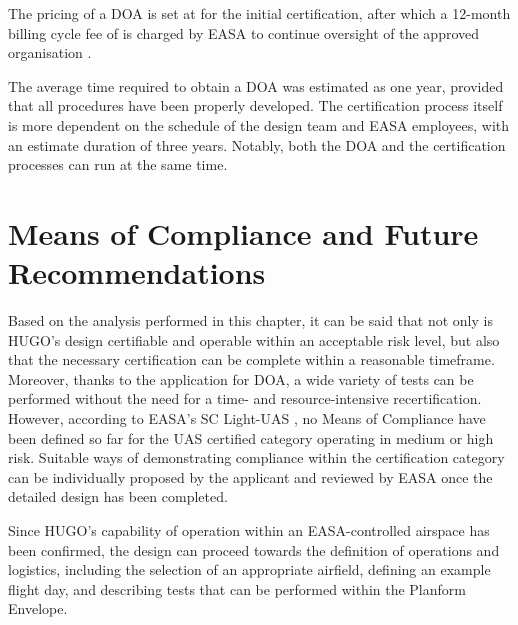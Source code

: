 The pricing of a DOA is set at  for the initial certification, after which a 12-month billing cycle fee of  is charged by EASA to continue oversight of the approved organisation  \cite{EUReg2025_2347}.


The average time required to obtain a DOA was estimated as one year, provided that all procedures have been properly developed. The certification process itself is more dependent on the schedule of the design team and EASA employees, with an estimate duration of three years. Notably, both the DOA and the certification processes can run at the same time.

\section{Means of Compliance and Future Recommendations}
\label{sec:means_of_compliance}
Based on the analysis performed in this chapter, it can be said that not only is HUGO's design certifiable and operable within an acceptable risk level, but also that the necessary certification can be complete within a reasonable timeframe. Moreover, thanks to the application for DOA, a wide variety of tests can be performed without the need for a time- and resource-intensive recertification. However, according to EASA's SC Light-UAS \cite{easa_light_uas_crd_is3}, no Means of Compliance have been defined so far for the UAS certified category operating in medium or high risk. Suitable ways of demonstrating compliance within the certification category can be individually proposed by the applicant and reviewed by EASA once the detailed design has been completed.

Since HUGO's capability of operation within an EASA-controlled airspace has been confirmed, the design can proceed towards the definition of operations and logistics, including the selection of an appropriate airfield, defining an example flight day, and describing tests that can be performed within the Planform Envelope.


























